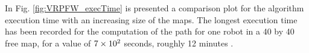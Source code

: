 



In Fig. \ref{fig:VRPFW_execTime} is presented a comparison plot for the algorithm execution time with an increasing size of the maps.  The longest execution time has been recorded for the computation of the path for one robot in a 40 by 40 free map, for a value of $7\times 10^{2}$ seconds, roughly 12 minutes \footnotemark[1].







